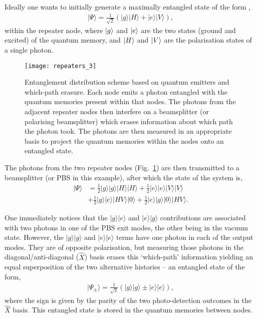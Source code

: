 Ideally one wants to initially generate a maximally entangled state of the form \cite{bib:WJM2015},
\begin{align}
|\Psi\rangle=\frac{1}{\sqrt{2}} (|g\rangle |H\rangle + |e\rangle |V\rangle),
\end{align}
within the repeater node, where $|g\rangle$ and $|e\rangle$ are the two states (ground and excited) of the quantum memory, and $|H\rangle$ and $|V\rangle$ are the polarisation states of a single photon. 
\begin{figure}[!htb]
\texttt{[image: repeaters\_3]}
\caption{Entanglement distribution scheme based on quantum emitters and which-path erasure. Each node emits a photon entangled with the quantum memories present within that nodes. The photons from the adjacent repeater nodes then interfere on a beamsplitter (or polarising beamsplitter) which erases information about which path the photon took. The photons are then measured in an appropriate basis to project the quantum memories within the nodes onto an entangled state.} 
\label{fig:repeaters_3}
\end{figure} 
The photons from the two repeater nodes (Fig.~\ref{fig:repeaters_3}) are then transmitted to a beamsplitter (or PBS in this example), after which the state of the system is,
\begin{align}
|\Psi\rangle &= \frac{1}{2} |g\rangle |g\rangle |H\rangle |H\rangle +\frac{1}{2} |e\rangle |e\rangle |V\rangle |V\rangle \nonumber \\
&+\frac{1}{2} |g\rangle |e\rangle |HV\rangle |0\rangle + \frac{1}{2} |e\rangle |g\rangle |0\rangle |HV\rangle. 
\end{align}

One immediately notices that the $|g\rangle |e\rangle$ and $|e\rangle |g\rangle$ contributions are associated with two photons in one of the PBS exit modes, the other being in the vacuum state. However, the $|g\rangle |g\rangle$ and $|e\rangle |e\rangle$ terms have one photon in each of the output modes. They are of opposite polarisation, but measuring those photons in the diagonal/anti-diagonal ($\hat{X}$) basis erases this `which-path' information yielding an equal superposition of the two alternative histories -- an entangled state of the form,
\begin{align}
|\Psi_\pm\rangle=\frac{1}{\sqrt{2}} (|g\rangle |g\rangle \pm |e\rangle |e\rangle),
\end{align}
where the sign is given by the parity of the two photo-detection outcomes in the $\hat{X}$ basis. This entangled state is stored in the quantum memories between nodes. 

